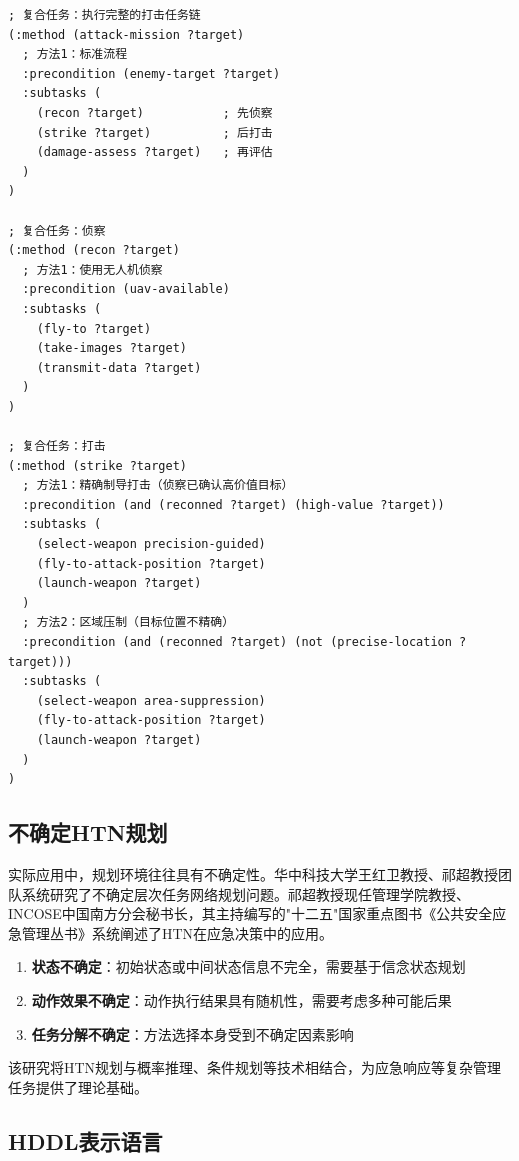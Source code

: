 \begin{lstlisting}[caption=案例B-v2的HTN方法定义（SHOP风格伪代码）]
; 复合任务：执行完整的打击任务链
(:method (attack-mission ?target)
  ; 方法1：标准流程
  :precondition (enemy-target ?target)
  :subtasks (
    (recon ?target)           ; 先侦察
    (strike ?target)          ; 后打击
    (damage-assess ?target)   ; 再评估
  )
)

; 复合任务：侦察
(:method (recon ?target)
  ; 方法1：使用无人机侦察
  :precondition (uav-available)
  :subtasks (
    (fly-to ?target)
    (take-images ?target)
    (transmit-data ?target)
  )
)

; 复合任务：打击
(:method (strike ?target)
  ; 方法1：精确制导打击（侦察已确认高价值目标）
  :precondition (and (reconned ?target) (high-value ?target))
  :subtasks (
    (select-weapon precision-guided)
    (fly-to-attack-position ?target)
    (launch-weapon ?target)
  )
  ; 方法2：区域压制（目标位置不精确）
  :precondition (and (reconned ?target) (not (precise-location ?target)))
  :subtasks (
    (select-weapon area-suppression)
    (fly-to-attack-position ?target)
    (launch-weapon ?target)
  )
)
\end{lstlisting}

\subsection{不确定HTN规划}

实际应用中，规划环境往往具有不确定性。华中科技大学王红卫教授、祁超教授团队系统研究了不确定层次任务网络规划问题。祁超教授现任管理学院教授、INCOSE中国南方分会秘书长，其主持编写的"十二五"国家重点图书《公共安全应急管理丛书》系统阐述了HTN在应急决策中的应用。

\begin{keypoint}
\begin{enumerate}
  \item \textbf{状态不确定}：初始状态或中间状态信息不完全，需要基于信念状态规划
  \item \textbf{动作效果不确定}：动作执行结果具有随机性，需要考虑多种可能后果
  \item \textbf{任务分解不确定}：方法选择本身受到不确定因素影响
\end{enumerate}
该研究将HTN规划与概率推理、条件规划等技术相结合，为应急响应等复杂管理任务提供了理论基础。
\end{keypoint}

\subsection{HDDL表示语言}

